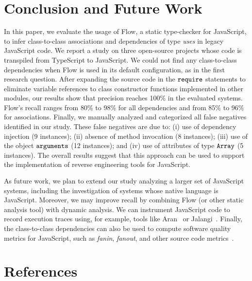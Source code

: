 \documentclass[review]{elsarticle}
\newcommand{\mcode}[1]{$\tt #1$}
\begin{document}
\section{Conclusion and Future Work}
\label{sec:conclusion}

In this paper, we evaluate the usage of Flow, a static type-checker for JavaScript, to infer class-to-class associations and dependencies of type \textit{uses} in legacy JavaScript code. We report a study on three open-source projects whose code is transpiled from TypeScript to JavaScript. We could not find any class-to-class dependencies when Flow is used in its default configuration, as in the first research question. After expanding the source code in the \mcode{require} statements to eliminate variable references to class constructor functions implemented in other modules, our results show that precision reaches 100\% in the evaluated systems. Flow's recall ranges from 80\% to 98\% for all dependencies and from 85\% to 96\% for associations. Finally, we manually analyzed and categorized all false negatives identified in our study. These false negatives are due to: (i) use of dependency injection (9 instances); (ii) absence of method invocation (8 instances); (iii) use of the object \mcode{arguments} (12 instances); and (iv) use of attributes of type \mcode{Array} (5 instances). The overall results suggest that this approach can be used to support the implementation of reverse engineering tools for JavaScript. 

As future work, we plan to extend our study analyzing a larger set of JavaScript systems, including the investigation of systems whose native language is JavaScript. Moreover, we may improve recall by combining Flow (or other static analysis tool) with dynamic analysis. We can instrument JavaScript code to record execution traces using, for example, tools like Aran~\cite{aran-2015} or Jalangi~\cite{jalangi2013}. Finally, the class-to-class dependencies can also be used to compute software quality metrics for JavaScript, such as \textit{fanin}, \textit{fanout}, and other source code metrics~\cite{CK_metrics}.



\section*{References}


\end{document}
